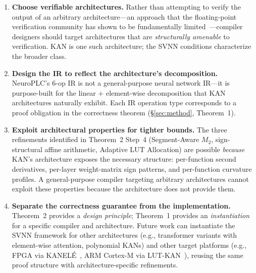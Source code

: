 \begin{enumerate}
    \item \textbf{Choose verifiable architectures.} Rather than attempting
          to verify the output of an arbitrary architecture---an approach
          that the floating-point verification community has shown to be
          fundamentally limited~\cite{szasz2025floating}---compiler
          designers should target
          architectures that are \textit{structurally amenable} to
          verification. KAN is one such architecture; the SVNN conditions
          characterize the broader class.

    \item \textbf{Design the IR to reflect the architecture's
          decomposition.} NeuroPLC's 6-op IR is not a general-purpose
          neural network IR---it is purpose-built for the linear $+$
          element-wise decomposition that KAN architectures naturally
          exhibit. Each IR operation type corresponds to a proof obligation
          in the correctness theorem ({\S}\ref{sec:method}, Theorem~1).

    \item \textbf{Exploit architectural properties for tighter bounds.}
          The three refinements identified in Theorem~2 Step~4
          (Segment-Aware $M_2$, sign-structural affine arithmetic, Adaptive LUT
          Allocation) are possible \textit{because} KAN's architecture
          exposes the necessary structure: per-function second derivatives,
          per-layer weight-matrix sign patterns, and per-function curvature
          profiles. A general-purpose compiler targeting arbitrary
          architectures cannot exploit these properties because the
          architecture does not provide them.

    \item \textbf{Separate the correctness guarantee from the
          implementation.} Theorem~2 provides a \textit{design principle};
          Theorem~1 provides an \textit{instantiation} for a specific
          compiler and architecture. Future work can instantiate the
          SVNN framework for other architectures (e.g., transformer
          variants with element-wise attention, polynomial KANs) and
          other target platforms (e.g., FPGA via KANEL\'{E}~\cite{kanele2026},
          ARM Cortex-M via LUT-KAN~\cite{lutkan2024}), reusing the same
          proof structure with architecture-specific refinements.


\end{enumerate}
